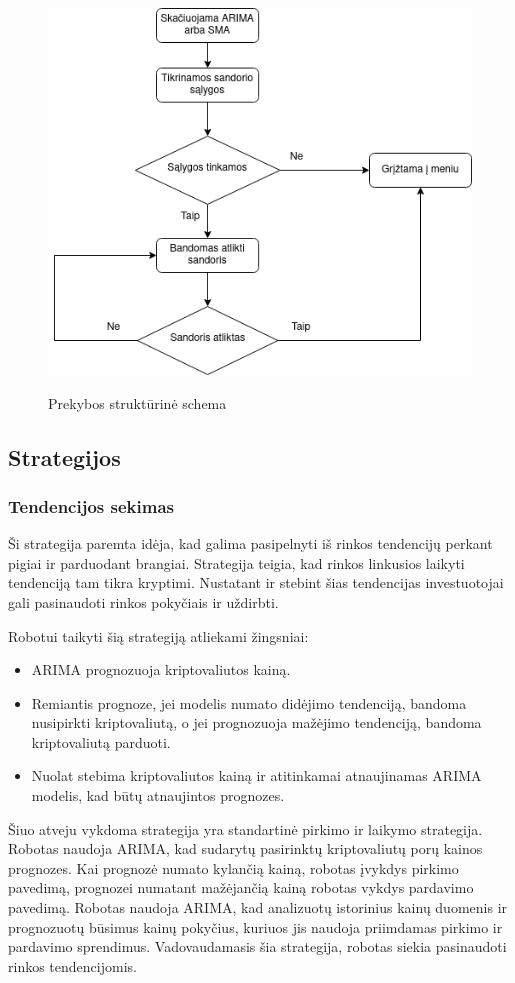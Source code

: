 \documentclass{VUMIFInfKursinis}
\begin{document}
\begin{figure}[H]
  \centering
  \includegraphics[width=.5\textwidth]{img/prekyba.png}
  \label{fig:trade_flowchart}
  \caption{Prekybos struktūrinė schema}
\end{figure}


\subsection{Strategijos}
\subsubsection{Tendencijos sekimas}

Ši strategija paremta idėja, kad galima pasipelnyti iš rinkos tendencijų perkant pigiai ir parduodant brangiai\cite{hurst2017century}. Strategija teigia, kad rinkos linkusios laikyti
tendenciją tam tikra kryptimi. Nustatant ir stebint šias tendencijas investuotojai gali pasinaudoti rinkos pokyčiais ir uždirbti.

Robotui taikyti šią strategiją atliekami žingsniai:
\begin {itemize}
\item ARIMA prognozuoja kriptovaliutos kainą.
\item Remiantis prognoze, jei modelis numato didėjimo tendenciją, bandoma nusipirkti kriptovaliutą, o jei prognozuoja mažėjimo tendenciją, bandoma kriptovaliutą parduoti.
\item Nuolat stebima kriptovaliutos kainą ir atitinkamai atnaujinamas ARIMA modelis, kad būtų atnaujintos prognozes.
\end{itemize}

Šiuo atveju vykdoma strategija yra standartinė pirkimo ir laikymo strategija. Robotas naudoja ARIMA, kad sudarytų pasirinktų kriptovaliutų porų kainos prognozes. 
Kai prognozė numato kylančią kainą, robotas įvykdys pirkimo pavedimą, prognozei numatant mažėjančią kainą robotas vykdys pardavimo pavedimą.
Robotas naudoja ARIMA, kad analizuotų istorinius kainų duomenis ir prognozuotų būsimus kainų pokyčius, kuriuos jis naudoja priimdamas pirkimo ir pardavimo sprendimus.
Vadovaudamasis šia strategija, robotas siekia pasinaudoti rinkos tendencijomis. 
\end{document}
